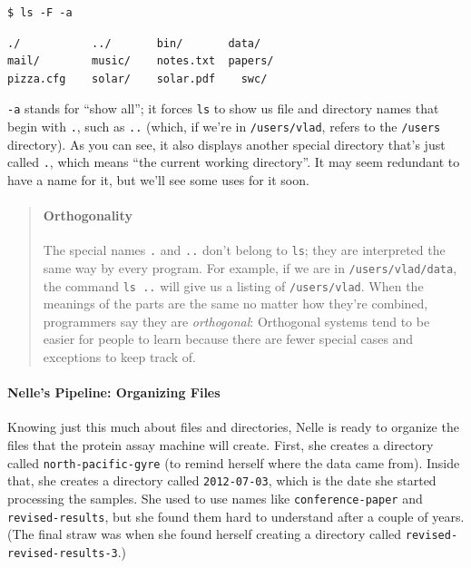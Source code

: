\documentclass[]{book}
\newcommand{\gdef}[2]{\emph{#2}}
\begin{document}
\begin{verbatim}
$ ls -F -a
\end{verbatim}

\begin{verbatim}
./           ../       bin/       data/
mail/        music/    notes.txt  papers/
pizza.cfg    solar/    solar.pdf    swc/
\end{verbatim}

\texttt{-a} stands for ``show all''; it forces \texttt{ls} to show us
file and directory names that begin with \texttt{.}, such as \texttt{..}
(which, if we're in \texttt{/users/vlad}, refers to the \texttt{/users}
directory). As you can see, it also displays another special directory
that's just called \texttt{.}, which means ``the current working
directory''. It may seem redundant to have a name for it, but we'll see
some uses for it soon.

\begin{quote}
\mbox{}\paragraph{Orthogonality}

The special names \texttt{.} and \texttt{..} don't belong to
\texttt{ls}; they are interpreted the same way by every program. For
example, if we are in \texttt{/users/vlad/data}, the command
\texttt{ls ..} will give us a listing of \texttt{/users/vlad}. When the
meanings of the parts are the same no matter how they're combined,
programmers say they are \gdef{g:orthogonal}{orthogonal}: Orthogonal
systems tend to be easier for people to learn because there are fewer
special cases and exceptions to keep track of.
\end{quote}

\mbox{}\paragraph{Nelle's Pipeline: Organizing Files}

Knowing just this much about files and directories, Nelle is ready to
organize the files that the protein assay machine will create. First,
she creates a directory called \texttt{north-pacific-gyre} (to remind
herself where the data came from). Inside that, she creates a directory
called \texttt{2012-07-03}, which is the date she started processing the
samples. She used to use names like \texttt{conference-paper} and
\texttt{revised-results}, but she found them hard to understand after a
couple of years. (The final straw was when she found herself creating a
directory called \texttt{revised-revised-results-3}.)
\end{document}
